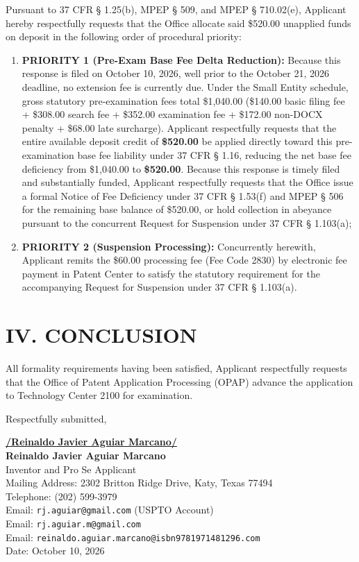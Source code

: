 \documentclass[11pt,letterpaper]{article}
\begin{document}
Pursuant to 37 CFR \S{} 1.25(b), MPEP \S{} 509, and MPEP \S{} 710.02(e), Applicant hereby respectfully requests that the Office allocate said \$520.00 unapplied funds on deposit in the following order of procedural priority:
\begin{enumerate}[leftmargin=*]
    \item \textbf{PRIORITY 1 (Pre-Exam Base Fee Delta Reduction):} Because this response is filed on October 10, 2026, well prior to the October 21, 2026 deadline, no extension fee is currently due. Under the Small Entity schedule, gross statutory pre-examination fees total \$1,040.00 (\$140.00 basic filing fee + \$308.00 search fee + \$352.00 examination fee + \$172.00 non-DOCX penalty + \$68.00 late surcharge). Applicant respectfully requests that the entire available deposit credit of \textbf{\$520.00} be applied directly toward this pre-examination base fee liability under 37 CFR \S{} 1.16, reducing the net base fee deficiency from \$1,040.00 to \textbf{\$520.00}. Because this response is timely filed and substantially funded, Applicant respectfully requests that the Office issue a formal Notice of Fee Deficiency under 37 CFR \S{} 1.53(f) and MPEP \S{} 506 for the remaining base balance of \$520.00, or hold collection in abeyance pursuant to the concurrent Request for Suspension under 37 CFR \S{} 1.103(a);
    \item \textbf{PRIORITY 2 (Suspension Processing):} Concurrently herewith, Applicant remits the \$60.00 processing fee (Fee Code 2830) by electronic fee payment in Patent Center to satisfy the statutory requirement for the accompanying Request for Suspension under 37 CFR \S{} 1.103(a).
\end{enumerate}

\section*{IV. CONCLUSION}

All formality requirements having been satisfied, Applicant respectfully requests that the Office of Patent Application Processing (OPAP) advance the application to Technology Center 2100 for examination.

\vspace{0.6cm}
\begin{singlespace}
\noindent Respectfully submitted, \par\vspace{0.8cm}
\underline{\textbf{/Reinaldo Javier Aguiar Marcano/}} \\
\textbf{Reinaldo Javier Aguiar Marcano} \\
Inventor and Pro Se Applicant \\
Mailing Address: 2302 Britton Ridge Drive, Katy, Texas 77494 \\
Telephone: (202) 599-3979 \\
Email: \texttt{rj.aguiar@gmail.com} (USPTO Account) \\
Email: \texttt{rj.aguiar.m@gmail.com} \\
Email: \texttt{reinaldo.aguiar.marcano@isbn9781971481296.com} \\
Date: October 10, 2026
\end{singlespace}
\end{document}
